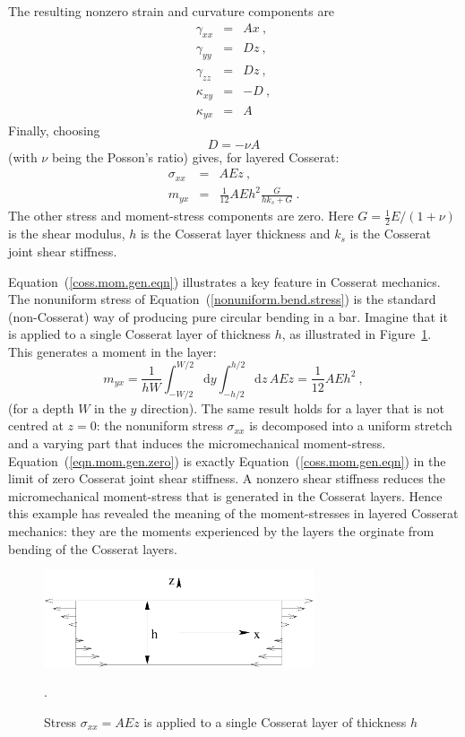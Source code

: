 \documentclass[]{scrreprt}
\begin{document}
The resulting nonzero strain and curvature components are
\begin{eqnarray}
\gamma_{xx} & = & Ax \ , \\
\gamma_{yy} & = & Dz \ , \\
\gamma_{zz} & = & Dz \ , \\
\kappa_{xy} & = & -D \ , \\
\kappa_{yx} & = & A
\end{eqnarray}
Finally, choosing
\begin{equation}
D = -\nu A
\end{equation}
(with $\nu$ being the Posson's ratio) gives, for layered Cosserat:
\begin{eqnarray}
\sigma_{xx} & = & AEz
\label{nonuniform.bend.stress} \ , \\
m_{yx} & = & \mbox{$\frac{1}{12}$}AEh^{2} \frac{G}{hk_{s} + G} \ .
\label{coss.mom.gen.eqn}
\end{eqnarray}
The other stress and moment-stress components are zero.  Here $G =
\frac{1}{2}E/(1+\nu)$ is the shear modulus, $h$ is the Cosserat layer
thickness and $k_{s}$ is the Cosserat joint shear stiffness.

Equation~(\ref{coss.mom.gen.eqn}) illustrates a key feature in Cosserat
mechanics.  The nonuniform stress of
Equation~(\ref{nonuniform.bend.stress}) is the standard (non-Cosserat)
way of producing pure circular bending in a bar.  Imagine that it is
applied to a single Cosserat layer of thickness $h$, as illustrated in
Figure~\ref{nonuniform_stress.fig}.  This generates a moment in the layer:
\begin{equation}
m_{yx} =
\frac{1}{hW}\int_{-W/2}^{W/2}\mathrm{d}y\int_{-h/2}^{h/2}\mathrm{d}z\,
AEz = \mbox{$\frac{1}{12}$}AEh^{2} \ ,
\label{eqn.mom.gen.zero}
\end{equation}
(for a depth $W$ in the $y$ direction).  The same result holds for a
layer that is not centred at $z=0$: the nonuniform stress
$\sigma_{xx}$ is decomposed into a uniform stretch and a varying part
that induces the micromechanical moment-stress.
Equation~(\ref{eqn.mom.gen.zero}) is exactly
Equation~(\ref{coss.mom.gen.eqn}) in the limit of zero Cosserat joint
shear stiffness.  A nonzero shear stiffness reduces the
micromechanical moment-stress that is generated in the Cosserat
layers.  Hence this example has revealed the meaning of the
moment-stresses in layered Cosserat mechanics: they are the moments
experienced by the layers the orginate from bending of the Cosserat layers.

\begin{figure}[htb]
\begin{center}
\includegraphics[width=8cm]{nonuniform_stress.pdf}
\caption{Stress $\sigma_{xx}=AEz$ is applied to a single Cosserat
  layer of thickness $h$}.
\label{nonuniform_stress.fig}
\end{center}
\end{figure}
\end{document}
